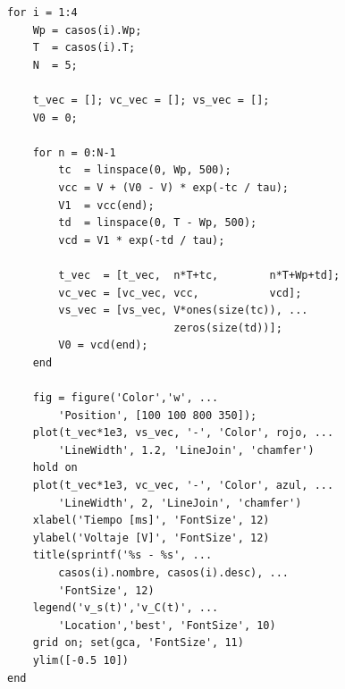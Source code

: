\documentclass[12pt,a4paper]{article}
\begin{document}
\begin{lstlisting}[style=matlab, caption={C\'odigo completo de simulaci\'on del circuito RC.}]
for i = 1:4
    Wp = casos(i).Wp;
    T  = casos(i).T;
    N  = 5;

    t_vec = []; vc_vec = []; vs_vec = [];
    V0 = 0;

    for n = 0:N-1
        tc  = linspace(0, Wp, 500);
        vcc = V + (V0 - V) * exp(-tc / tau);
        V1  = vcc(end);
        td  = linspace(0, T - Wp, 500);
        vcd = V1 * exp(-td / tau);

        t_vec  = [t_vec,  n*T+tc,        n*T+Wp+td];
        vc_vec = [vc_vec, vcc,           vcd];
        vs_vec = [vs_vec, V*ones(size(tc)), ...
                          zeros(size(td))];
        V0 = vcd(end);
    end

    fig = figure('Color','w', ...
        'Position', [100 100 800 350]);
    plot(t_vec*1e3, vs_vec, '-', 'Color', rojo, ...
        'LineWidth', 1.2, 'LineJoin', 'chamfer')
    hold on
    plot(t_vec*1e3, vc_vec, '-', 'Color', azul, ...
        'LineWidth', 2, 'LineJoin', 'chamfer')
    xlabel('Tiempo [ms]', 'FontSize', 12)
    ylabel('Voltaje [V]', 'FontSize', 12)
    title(sprintf('%s - %s', ...
        casos(i).nombre, casos(i).desc), ...
        'FontSize', 12)
    legend('v_s(t)','v_C(t)', ...
        'Location','best', 'FontSize', 10)
    grid on; set(gca, 'FontSize', 11)
    ylim([-0.5 10])
end
\end{lstlisting}
\end{document}
